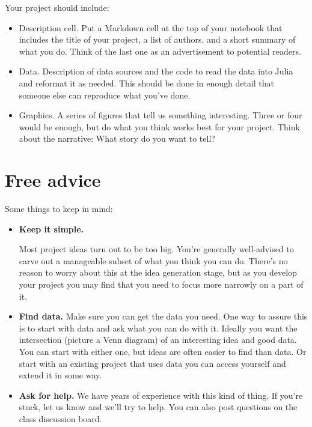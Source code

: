\documentclass[11pt]{article}
\begin{document}
\begin{itemize}
Your project should include:
\begin{itemize}
\item Description cell.  Put a Markdown cell at the top of your notebook that
includes the title of your project, a list of authors, and a short summary of
what you do.  Think of the last one as an advertisement to potential readers.
\item Data.  Description of data sources and the code to read the data into
Julia and reformat it as needed. This should be done in enough detail that
someone else can reproduce what you've done.
\item Graphics.  A series of figures that tell us something interesting. Three
or four would be enough, but do what you think works best for your project.
Think about the narrative:  What story do you want to tell?
\end{itemize}

\end{itemize}


\section*{Free advice}

Some things to keep in mind:
%
\begin{itemize}
\item {\bf Keep it simple.}

Most project ideas turn out to be too big.  You're generally well-advised to
carve out a manageable subset of what you think you can do. There's no reason to
worry about this at the idea generation stage, but as you develop your project
you may find that you need to focus more narrowly on a part of it.

\item {\bf Find data.}  Make sure you can get the data you need. One way to
assure this is to start with data and ask what you can do with it. Ideally you
want the intersection (picture a Venn diagram) of an interesting idea and good
data.  You can start with either one, but ideas are often easier to find than
data. Or start with an existing project that uses data you can access yourself
and extend it in some way.


\item {\bf Ask for help.}
We have years of experience with this kind of thing. If you're stuck, let us
know and we'll try to help. You can also post questions on the class discussion
board.

\end{itemize}
\end{document}

